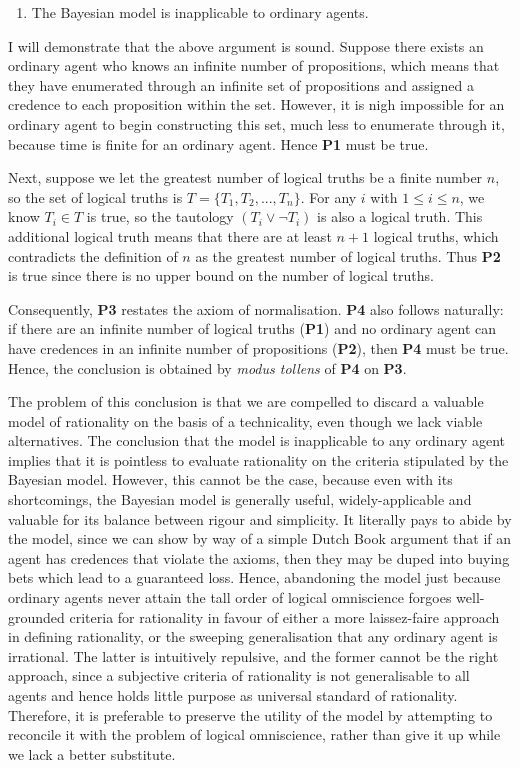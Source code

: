\documentclass[12pt]{article}
\begin{document}
\begin{enumerate}[resume,label=\textbf{C:}, topsep=0pt, leftmargin=0.5in]
    \item The Bayesian model is inapplicable to ordinary agents.
\end{enumerate}

I will demonstrate that the above argument is sound. Suppose there exists an ordinary agent who knows an infinite number of propositions, which means that they have enumerated through an infinite set of propositions and assigned a credence to each proposition within the set. However, it is nigh impossible for an ordinary agent to begin constructing this set, much less to enumerate through it, because time is finite for an ordinary agent. Hence \textbf{P1} must be true.

Next, suppose we let the greatest number of logical truths be a finite number $n$, so the set of logical truths is $T=\{T_1,T_2,...,T_n\}$. For any $i$ with $1\leq i\leq n$, we know $T_i\in T$ is true, so the tautology $(T_i\lor\lnot T_i)$ is also a logical truth. This additional logical truth means that there are at least $n+1$ logical truths, which contradicts the definition of $n$ as the greatest number of logical truths. Thus \textbf{P2} is true since there is no upper bound on the number of logical truths.

Consequently, \textbf{P3} restates the axiom of normalisation. \textbf{P4} also follows naturally: if there are an infinite number of logical truths (\textbf{P1}) and no ordinary agent can have credences in an infinite number of propositions (\textbf{P2}), then \textbf{P4} must be true. Hence, the conclusion is obtained by \textit{modus tollens} of \textbf{P4} on \textbf{P3}.

The problem of this conclusion is that we are compelled to discard a valuable model of rationality on the basis of a technicality, even though we lack viable alternatives. The conclusion that the model is inapplicable to any ordinary agent implies that it is pointless to evaluate rationality on the criteria stipulated by the Bayesian model. However, this cannot be the case, because even with its shortcomings, the Bayesian model is generally useful, widely-applicable and valuable for its balance between rigour and simplicity. It literally pays to abide by the model, since we can show by way of a simple Dutch Book argument that if an agent has credences that violate the axioms, then they may be duped into buying bets which lead to a guaranteed loss.\autocite[44]{bdrc} Hence, abandoning the model just because ordinary agents never attain the tall order of logical omniscience forgoes well-grounded criteria for rationality in favour of either a more laissez-faire approach in defining rationality, or the sweeping generalisation that any ordinary agent is irrational. The latter is intuitively repulsive, and the former cannot be the right approach, since a subjective criteria of rationality is not generalisable to all agents and hence holds little purpose as universal standard of rationality. Therefore, it is preferable to preserve the utility of the model by attempting to reconcile it with the problem of logical omniscience, rather than give it up while we lack a better substitute.
\end{document}
